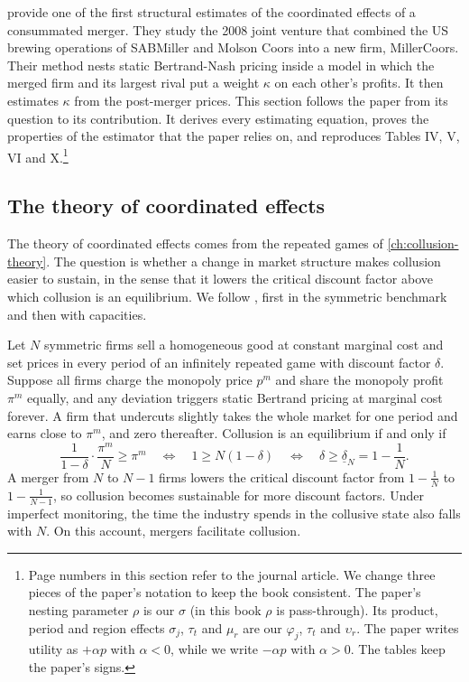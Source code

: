 \citet{MillerWeinberg2017} provide one of the first structural estimates of the coordinated effects of a consummated
merger.
They study the 2008 joint venture that combined the US brewing operations of SABMiller and Molson Coors into a new
firm, MillerCoors. Their method nests static Bertrand-Nash pricing inside a model in which the merged firm and its
largest rival put a weight $\kappa$ on each other's profits. It then estimates $\kappa$ from the post-merger prices.
This section follows the paper from its question to its contribution. It derives every estimating equation, proves
the properties of the estimator that the paper relies on, and reproduces Tables IV, V, VI and X.\footnote{Page
numbers in this section refer to the journal article. We change three pieces of the paper's notation to keep the
book consistent. The paper's nesting parameter $\rho$ is our $\sigma$ (in this book $\rho$ is pass-through). Its
product, period and region effects $\sigma_j$, $\tau_t$ and $\mu_r$ are our $\varphi_j$, $\tau_t$ and $\upsilon_r$.
The paper writes utility as $+\alpha p$ with $\alpha < 0$, while we write $-\alpha p$ with $\alpha > 0$. The tables
keep the paper's signs.}

\subsection{The theory of coordinated effects}\label{sec:11-ce-theory}

The theory of coordinated effects comes from the repeated games of \cref{ch:collusion-theory}. The question is
whether a change in market structure makes collusion easier to sustain, in the sense that it lowers the critical
discount factor above which collusion is an equilibrium. We follow \citet[pp.~239--240]{AskerNocke2021}, first in
the symmetric benchmark and then with capacities.

Let $N$ symmetric firms sell a homogeneous good at constant marginal cost and set prices in every period of an
infinitely repeated game with discount factor $\delta$. Suppose all firms charge the monopoly price $p^m$ and share
the monopoly profit $\pi^m$ equally, and any deviation triggers static Bertrand pricing at marginal cost forever. A
firm that undercuts slightly takes the whole market for one period and earns close to $\pi^m$, and zero thereafter.
Collusion is an equilibrium if and only if
\begin{equation*}
\frac{1}{1 - \delta}\cdot\frac{\pi^m}{N} \ge \pi^m
\quad\Longleftrightarrow\quad
1 \ge N(1 - \delta)
\quad\Longleftrightarrow\quad
\delta \ge \underline\delta_N = 1 - \frac{1}{N} .
\end{equation*}
A merger from $N$ to $N - 1$ firms lowers the critical discount factor from $1 - \frac{1}{N}$ to $1 - \frac{1}{N -
1}$, so collusion becomes sustainable for more discount factors. Under imperfect monitoring, the time the industry
spends in the collusive state also falls with $N$. On this account, mergers facilitate collusion.

